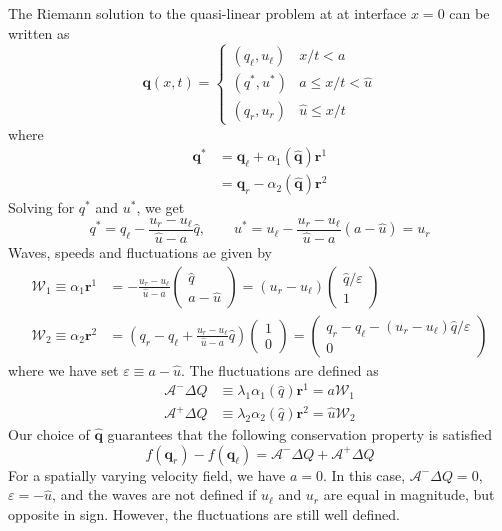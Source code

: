 \documentclass{article}
\begin{document}
The Riemann solution to the quasi-linear problem at at interface $x=0$ can be written as 
\begin{equation}
\mathbf q(x,t) = \left\{\begin{array}{ll}
(q_\ell, u_\ell) &   x/t < a \\ 
(q^*, u^*)       &   a   \le x/t < \widehat{u} \\ 
(q_r, u_r)       &   \widehat{u} \le x/t
\end{array}
\right.
\end{equation}
where
\begin{align}
\mathbf q^* 
& = \mathbf q_\ell + \alpha_1(\widehat{\mathbf q}) {\mathbf r}^1 \\
& = \mathbf q_r - \alpha_2(\widehat{\mathbf q}) {\mathbf r}^2
\end{align}
Solving for $q^*$ and $u^*$, we get
\begin{equation}
q^*  = q_\ell - \frac{u_r - u_\ell}{\widehat{u}-a} \widehat{q}, \qquad
u^*  = u_\ell - \frac{u_r - u_\ell}{\widehat{u}-a} (a - \widehat{u}) = u_r
\end{equation}
Waves, speeds and fluctuations ae given by
\begin{align}
\mathcal W_1  \equiv \alpha_1 \mathbf r^1 & = - \frac{u_r - u_\ell}{\widehat{u}-a} 
\left(\begin{array}{c} \widehat{q} \\ a - \widehat{u}\end{array}\right) 
= (u_r - u_\ell)
\left(\begin{array}{c} \widehat{q}/\varepsilon \\ 
1 \end{array}\right) \\
\mathcal W_2  \equiv \alpha_2 \mathbf r^2 & = 
\left(q_r - q_\ell + \frac{u_r - u_\ell}{\widehat{u}-a}\widehat{q} \right)
\left(\begin{array}{c} 1 \\ 0\end{array}\right) 
= \left(\begin{array}{c} q_r - q_\ell - (u_r - u_\ell) \widehat{q}/\varepsilon \\ 
0 \end{array}\right)
\end{align}
where we have set $\varepsilon \equiv a - \widehat{u}$. 
The fluctuations are  defined as
\begin{align}
\mathcal A^- \Delta Q & \equiv \lambda_1 \alpha_1(\widehat{q}) \mathbf r^1 
= a \mathcal W_1 \\
\mathcal A^+ \Delta Q & \equiv \lambda_2 \alpha_2(\widehat{q}) \mathbf r^2 
= \widehat{u} \mathcal W_2
\end{align}
Our choice of $\widehat{\mathbf q}$ guarantees that the following conservation property is satisfied
\begin{equation}
f(\mathbf q_r) - f(\mathbf q_\ell) = \mathcal A^- \Delta Q + \mathcal A^+ \Delta Q
\end{equation}
For a spatially varying velocity field, we have $a = 0$.  In this case, $\mathcal A^- \Delta Q = 0$, $\varepsilon = -\widehat{u}$, and the waves are not defined if $u_\ell$ and $u_r$ are equal in magnitude, but opposite in sign. However, the fluctuations are still well defined.  
\end{document}
